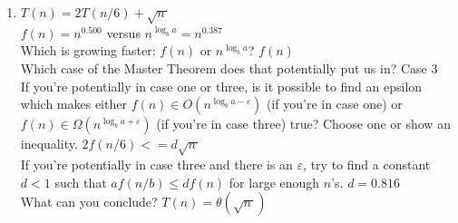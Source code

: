 \documentclass[12 pt]{amsart}
\renewcommand{\epsilon}{\varepsilon}
\begin{document}
\begin{enumerate}[label=\arabic*.)]
	\bigskip
	
	\item $T(n) = 2T(n/6) + \sqrt{n\,}$ \\
	$f(n) = n^{0.500}$ versus $n^{\log_b a} = n^{0.387}$ \\
	Which is growing faster: $f(n)$ or  $n^{\log_b a}$?     $f(n)$ \\
	Which case of the Master Theorem does that potentially put us in?   Case 3 \\
	If you're potentially in case one or three, is it possible to find an epsilon which makes either $f(n) \in O(n^{\log_b a - \epsilon})$ (if you're in case one) or $f(n) \in \Omega(n^{\log_b a+ \epsilon})$ (if you're in case three) true? Choose one or show an inequality.   $2f(n/6) <= d\sqrt{n\,}$ \\
	If you're potentially in case three and there is an $\epsilon$, try to find a constant $d<1$ such that $a f(n/b) \leq d f(n)$ for large enough $n$'s.
	    $d = 0.816$ \\
	What can you conclude?      $T(n) = \theta(\sqrt{n\,})$
	
\end{enumerate}
\end{document}
